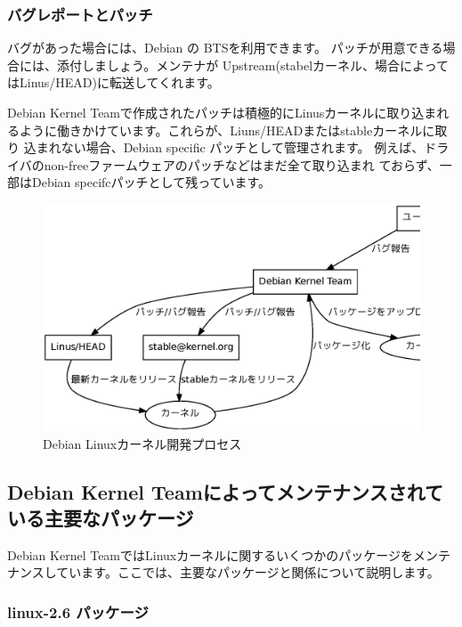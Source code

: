\documentclass[mingoth,a4paper]{jsarticle}
\begin{document}
\subsubsection{バグレポートとパッチ}
バグがあった場合には、Debian の BTSを利用できます。
パッチが用意できる場合には、添付しましょう。メンテナが
Upstream(stabelカーネル、場合によってはLinus/HEAD)に転送してくれます。

Debian Kernel Teamで作成されたパッチは積極的にLinusカーネルに取り込まれ
るように働きかけています。これらが、Liuns/HEADまたはstableカーネルに取り
込まれない場合、Debian specific パッチとして管理されます。
例えば、ドライバのnon-freeファームウェアのパッチなどはまだ全て取り込まれ
ておらず、一部はDebian specifcパッチとして残っています。

\begin{figure}[H]
\begin{center}
\includegraphics[width=1.0\hsize]{image201005/debian-kernel-devel.eps}
\caption{Debian Linuxカーネル開発プロセス}
\label{fig:debian-kernel-devel}
\end{center}
\end{figure}

\subsection{Debian Kernel Teamによってメンテナンスされている主要なパッケージ}

Debian Kernel TeamではLinuxカーネルに関するいくつかのパッケージをメンテ
ナンスしています。ここでは、主要なパッケージと関係について説明します。

\subsubsection{linux-2.6 パッケージ}
\end{document}
